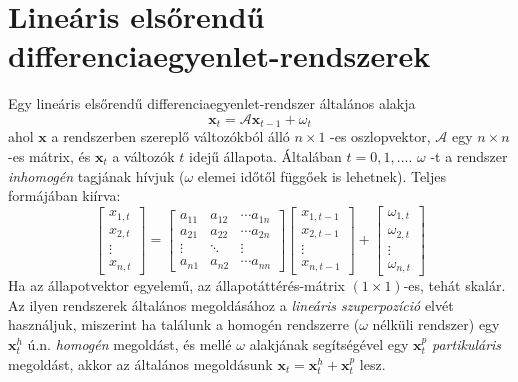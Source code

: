 \documentclass[14p]{article}
\begin{document}
\section{Lineáris elsőrendű differenciaegyenlet-rendszerek}
Egy lineáris elsőrendű differenciaegyenlet-rendszer általános alakja
\[
	\pmb{x}_{t} = \mathcal{A}\pmb{x}_{t-1} + \mathcal{\omega}_{t}
\]
ahol $\pmb{x}$ a rendszerben szereplő változókból álló $n \times 1$ -es oszlopvektor, $\mathcal{A}$ egy $n \times n$ -es mátrix, és $\pmb{x}_{t}$ a változók $t$ idejű állapota. Általában $t = 0, 1, ...$. $\omega$ -t a rendszer \emph{inhomogén} tagjának hívjuk ($\omega$ elemei időtől függőek is lehetnek). Teljes formájában kiírva:
\[
		\begin{bmatrix}
		x_{1,t} \\
		x_{2,t} \\
		\vdots \\
		x_{n,t}
		\end{bmatrix}
		=
		\begin{bmatrix}
		a_{11} & a_{12} & \cdots a_{1n} \\
		a_{21} & a_{22} & \cdots a_{2n} \\
		\vdots & \ddots & \vdots \\
		a_{n1} & a_{n2} & \cdots a_{nn}
		\end{bmatrix}
		\begin{bmatrix}
		x_{1,t-1} \\
		x_{2,t-1} \\
		\vdots \\
		x_{n,t-1}
		\end{bmatrix}
		+
		\begin{bmatrix}
		\omega_{1,t} \\
		\omega_{2,t} \\
		\vdots \\
		\omega_{n, t}
		\end{bmatrix}
\]
Ha az állapotvektor egyelemű, az állapotáttérés-mátrix $(1 \times 1)$-es, tehát skalár.
Az ilyen rendszerek általános megoldásához a \emph{lineáris szuperpozíció} elvét használjuk, miszerint ha találunk a homogén rendszerre ($\omega$ nélküli rendszer) egy $\pmb{x}^{h}_{t}$ ú.n. \emph{homogén} megoldást, és mellé $\omega$ alakjának segítségével egy $\pmb{x}^{p}_{t}$ \emph{partikuláris} megoldást, akkor az általános megoldásunk $\pmb{x}_{t} = \pmb{x}^{h}_{t} + \pmb{x}^{p}_{t}$ lesz.
\\
\end{document}
